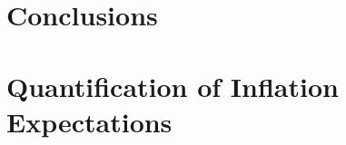 \documentclass[review]{elsarticle}
\begin{document}
\section{Conclusions} \label{sec:Conclusions}




\newpage

\appendix

\section{Quantification of Inflation Expectations}\label{sec:Quantification_of_Inflation_Expectations}
\end{document}

